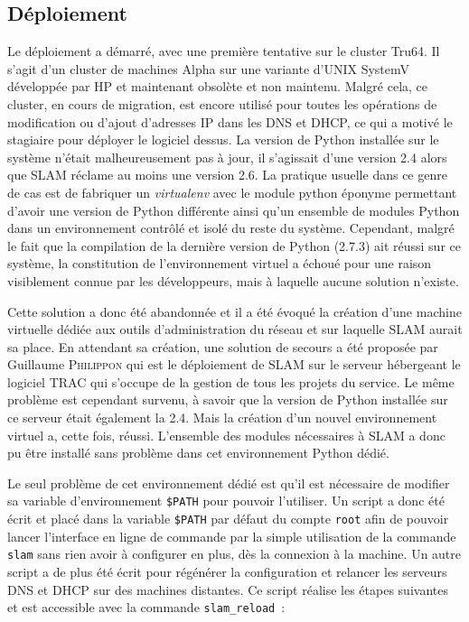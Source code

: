 \documentclass[12pt,a4paper,twoside]{report}
\begin{document}
\subsection{Déploiement}

Le déploiement a démarré, avec une première tentative sur le cluster Tru64. Il
s’agit d’un cluster de machines Alpha sur une variante d’UNIX SystemV développée
par HP et maintenant obsolète et non maintenu. 
Malgré cela, ce cluster, en cours de migration, est encore utilisé pour toutes les opérations de modification
ou d’ajout d’adresses IP dans les DNS et DHCP, ce qui a motivé le stagiaire
pour déployer le logiciel dessus. La version de Python installée sur le
système n’était malheureusement pas à jour, il s’agissait d’une version 2.4
alors que SLAM réclame au moins une version 2.6. La pratique usuelle dans ce
genre de cas est de fabriquer un \emph{virtualenv} avec le module python
éponyme permettant d’avoir une version de Python différente ainsi qu’un
ensemble de modules Python dans un environnement contrôlé et isolé du reste du
système. Cependant, malgré le fait que la compilation de la dernière version de
Python (2.7.3) ait réussi sur ce système, la constitution de l’environnement
virtuel a échoué pour une raison visiblement connue par les développeurs, mais
à laquelle aucune solution n’existe.

Cette solution a donc été abandonnée et il a été évoqué la création d’une
machine virtuelle dédiée aux outils d’administration du réseau et sur laquelle
SLAM aurait sa place. En attendant sa création, une solution de secours a été
proposée par Guillaume \textsc{Philippon} qui est le déploiement de SLAM sur
le serveur hébergeant le logiciel TRAC qui s’occupe de la gestion de tous les
projets du service. Le même problème est cependant survenu, à savoir que la
version de Python installée sur ce serveur était également la 2.4. Mais la
création d’un nouvel environnement virtuel a, cette fois, réussi. L’ensemble
des modules nécessaires à SLAM a donc pu être installé sans problème dans cet
environnement Python dédié.

Le seul problème de cet environnement dédié est qu’il est nécessaire de
modifier sa variable d’environnement \verb+$PATH+ pour pouvoir l’utiliser. Un
script a donc été écrit et placé dans la variable \verb+$PATH+ par défaut du
compte \verb+root+ afin de pouvoir lancer l’interface en ligne de commande par
la simple utilisation de la commande \verb+slam+ sans rien avoir à configurer
en plus, dès la connexion à la machine. Un autre script a de plus été écrit
pour régénérer la configuration et relancer les serveurs DNS et DHCP sur des
machines distantes. Ce script réalise les étapes suivantes et est accessible
avec la commande \verb+slam_reload+~:
\label{sec:slam_reload}
\end{document}
